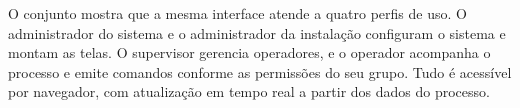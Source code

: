 \par O conjunto mostra que a mesma interface atende a quatro perfis de uso. O administrador do sistema e o administrador da instalação configuram o sistema e montam as telas. O supervisor gerencia operadores, e o operador acompanha o processo e emite comandos conforme as permissões do seu grupo. Tudo é acessível por navegador, com atualização em tempo real a partir dos dados do processo.

